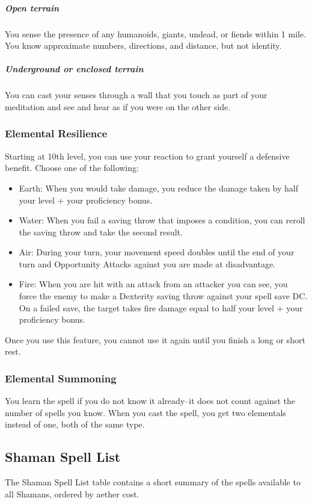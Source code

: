 \subparagraph*{Open terrain} You sense the presence of any humanoids, giants, undead, or fiends within 1 mile. You know approximate numbers, directions, and distance, but not identity.
\subparagraph*{Underground or enclosed terrain} You can cast your senses through a wall that you touch as part of your meditation and see and hear as if you were on the other side.

\subsubsection{Elemental Resilience}
Starting at 10th level, you can use your reaction to grant yourself a defensive benefit. Choose one of the following:
\begin{itemize}
	\item Earth: When you would take damage, you reduce the damage taken by half your level + your proficiency bonus.
	\item Water: When you fail a saving throw that imposes a condition, you can reroll the saving throw and take the second result.
	\item Air: During your turn, your movement speed doubles until the end of your turn and Opportunity Attacks against you are made at disadvantage.
	\item Fire: When you are hit with an attack from an attacker you can see, you force the enemy to make a Dexterity saving throw against your spell save DC. On a failed save, the target takes fire damage equal to half your level + your proficiency bonus.
\end{itemize}

Once you use this feature, you cannot use it again until you finish a long or short rest.

\subsubsection{Elemental Summoning}
You learn the  spell if you do not know it already--it does not count against the number of spells you know. When you cast the spell, you get two elementals instead of one, both of the same type.

\subsection{Shaman Spell List}
The Shaman Spell List table contains a short summary of the spells available to all Shamans, ordered by aether cost.

